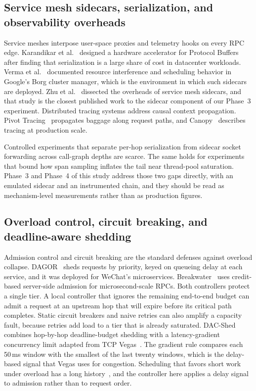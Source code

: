 \subsection{Service mesh sidecars, serialization, and observability overheads}

Service meshes interpose user-space proxies and telemetry hooks on every RPC edge. Karandikar et al.~\cite{karandikar2021protoacc} designed a hardware accelerator for Protocol Buffers after finding that serialization is a large share of cost in datacenter workloads. Verma et al.~\cite{verma2015borg} documented resource interference and scheduling behavior in Google's Borg cluster manager, which is the environment in which such sidecars are deployed. Zhu et al.~\cite{zhu2023sidecar} dissected the overheads of service mesh sidecars, and that study is the closest published work to the sidecar component of our Phase~3 experiment. Distributed tracing systems address causal context propagation. Pivot Tracing~\cite{mace2015pivot} propagates baggage along request paths, and Canopy~\cite{kaldor2017canopy} describes tracing at production scale.

Controlled experiments that separate per-hop serialization from sidecar socket forwarding across call-graph depths are scarce. The same holds for experiments that bound how span sampling inflates the tail near thread-pool saturation. Phase~3 and Phase~4 of this study address those two gaps directly, with an emulated sidecar and an instrumented chain, and they should be read as mechanism-level measurements rather than as production figures.

\subsection{Overload control, circuit breaking, and deadline-aware shedding}

Admission control and circuit breaking are the standard defenses against overload collapse. DAGOR~\cite{zhou2018dagor} sheds requests by priority, keyed on queueing delay at each service, and it was deployed for WeChat's microservices. Breakwater~\cite{cho2020breakwater} uses credit-based server-side admission for microsecond-scale RPCs. Both controllers protect a single tier. A local controller that ignores the remaining end-to-end budget can admit a request at an upstream hop that will expire before its critical path completes. Static circuit breakers and naive retries can also amplify a capacity fault, because retries add load to a tier that is already saturated. DAC-Shed combines hop-by-hop deadline-budget shedding with a latency-gradient concurrency limit adapted from TCP Vegas~\cite{brakmo1994vegas}. The gradient rule compares each 50\,ms window with the smallest of the last twenty windows, which is the delay-based signal that Vegas uses for congestion. Scheduling that favors short work under overload has a long history~\cite{schroeder2006web}, and the controller here applies a delay signal to admission rather than to request order.


